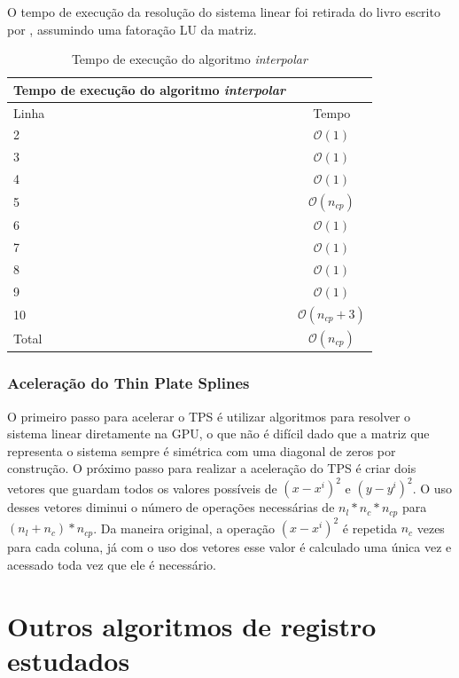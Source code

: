   O tempo de execução da resolução do sistema linear foi retirada do livro escrito por 
\cite[Part~IV]{trefethen1997numerical}, assumindo uma fatoração LU da matriz.

\begin{table}[H]
\begin{center}
\begin{tabular}{l|c}
\hline
Tempo de execução do algoritmo \textit{interpolar} \\
\hline
Linha&Tempo\\
\hline
2       &$\mathcal{O}(1)$ \\
3       &$\mathcal{O}(1)$ \\
4       &$\mathcal{O}(1)$\\
5       &$\mathcal{O}(n_{cp})$\\
6       &$\mathcal{O}(1)$\\
7       &$\mathcal{O}(1)$\\
8       &$\mathcal{O}(1)$\\
9       &$\mathcal{O}(1)$\\
10      &$\mathcal{O}(n_{cp}+3)$\\
\hline
Total   &$\mathcal{O}(n_{cp})$\\
\hline
\end{tabular}
\caption{Tempo de execução do algoritmo \textit{interpolar}}
\label{table:interpolar}
\end{center}
\end{table}

\subsubsection{Aceleração do Thin Plate Splines}

    O primeiro passo para acelerar o TPS é utilizar algoritmos para resolver o sistema linear diretamente na GPU, o que
não é difícil dado que a matriz que representa o sistema sempre é simétrica com uma diagonal de zeros por construção. O
próximo passo para realizar a aceleração do TPS é criar dois vetores que guardam todos os valores possíveis de $(x-x^i)^2$
e $(y-y^i)^2$. O uso desses vetores diminui o número de operações necessárias de $n_l*n_c*n_{cp}$ para $(n_l+n_c)*n_{cp}$.
Da maneira original, a operação $(x-x^i)^2$ é repetida $n_c$ vezes para cada coluna, já com o uso dos vetores esse valor
é calculado uma única vez e acessado toda vez que ele é necessário.

\section{Outros algoritmos de registro estudados}

